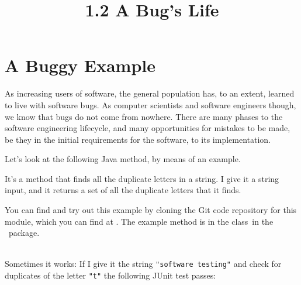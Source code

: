 



\title{1.2 A Bug's Life}

\section{A Buggy Example}


As increasing users of software, the general population has, to an extent,
learned to live with software bugs. As computer scientists and software
engineers though, we know that bugs do not come from nowhere. There are many
phases to the software engineering lifecycle, and many opportunities for
mistakes to be made, be they in the initial requirements for the software, to
its implementation.

Let's look at the following Java method, by means of an example.


It's a method that finds all the duplicate letters in a string. I give it a
string input, and it returns a set of all the duplicate letters that it finds.

You can find and try out this example by cloning the Git code repository for
this module, which you can find at \coderepourl. The example method is in
the class~\stringutilsbuggyoneclass in the \lecturespackage~package. 

\begin{center} 
\end{center}    
~\\

Sometimes it works: If I give it the string {\tt "software testing"} and check
for duplicates of the letter {\tt "t"} the following JUnit test passes:

\begin{center} 
\end{center} 

